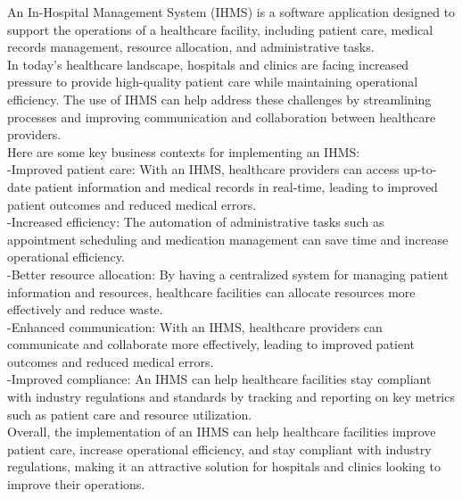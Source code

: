 \quad An In-Hospital Management System (IHMS) is a software application designed to support the operations of a healthcare facility, including patient care, medical records management, resource allocation, and administrative tasks.\\

In today's healthcare landscape, hospitals and clinics are facing increased pressure to provide high-quality patient care while maintaining operational efficiency. The use of IHMS can help address these challenges by streamlining processes and improving communication and collaboration between healthcare providers.\\
Here are some key business contexts for implementing an IHMS:\\
-Improved patient care: With an IHMS, healthcare providers can access up-to-date patient information and medical records in real-time, leading to improved patient outcomes and reduced medical errors.\\

-Increased efficiency: The automation of administrative tasks such as appointment scheduling and medication management can save time and increase operational efficiency.\\

-Better resource allocation: By having a centralized system for managing patient information and resources, healthcare facilities can allocate resources more effectively and reduce waste.\\

-Enhanced communication: With an IHMS, healthcare providers can communicate and collaborate more effectively, leading to improved patient outcomes and reduced medical errors.\\

-Improved compliance: An IHMS can help healthcare facilities stay compliant with industry regulations and standards by tracking and reporting on key metrics such as patient care and resource utilization.\\


Overall, the implementation of an IHMS can help healthcare facilities improve patient care, increase operational efficiency, and stay compliant with industry regulations, making it an attractive solution for hospitals and clinics looking to improve their operations.